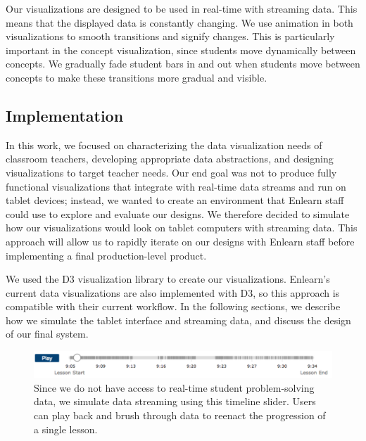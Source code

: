 \documentclass{sigchi}
\begin{document}
Our visualizations are designed to be used in real-time with streaming data. This means that the displayed data is constantly changing. We use animation in both visualizations to smooth transitions and signify changes. This is particularly important in the concept visualization, since students move dynamically between concepts. We gradually fade student bars in and out when students move between concepts to make these transitions more gradual and visible. %

\subsection{Implementation}
In this work, we focused on characterizing the data visualization needs of classroom teachers, developing appropriate data abstractions, and designing visualizations to target teacher needs. Our end goal was not to produce fully functional visualizations that integrate with real-time data streams and run on tablet devices; instead, we wanted to create an environment that Enlearn staff could use to explore and evaluate our designs. We therefore decided to simulate how our visualizations would look on tablet computers with streaming data. This approach will allow us to rapidly iterate on our designs with Enlearn staff before implementing a final production-level product.

We used the D3 visualization library to create our visualizations. Enlearn's current data visualizations are also implemented with D3, so this approach is compatible with their current workflow. In the following sections, we describe how we simulate the tablet interface and streaming data, and discuss the design of our final system.

\begin{figure}[t]
\centering
\includegraphics[width=180mm]{images/Timeline.pdf}
\caption{Since we do not have access to real-time student problem-solving data, we simulate data streaming using this timeline slider. Users can play back and brush through data to reenact the progression of a single lesson.}
\label{fig:Timeline}
\end{figure}
\end{document}
